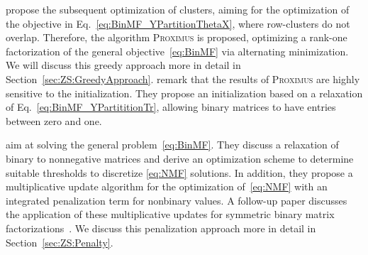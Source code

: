 \cite{koyuturk2003proximus} propose the subsequent optimization of clusters, aiming for the optimization of the objective in Eq.~\eqref{eq:BinMF_YPartitionThetaX}, where row-clusters do not overlap. Therefore, the algorithm \textsc{Proximus} is proposed, optimizing a rank-one factorization of the general objective~\eqref{eq:BinMF} via alternating minimization. We will discuss this greedy approach more in detail in Section~\ref{sec:ZS:GreedyApproach}.
\cite{shen2009mining} remark that the results of \textsc{Proximus} are highly sensitive to the initialization. They propose an initialization based on a relaxation of Eq.~\eqref{eq:BinMF_YPartititionTr}, allowing binary matrices to have entries between zero and one.

\cite{zhang2007binary,zhang2010binary} aim at solving the general problem~\eqref{eq:BinMF}. They discuss a relaxation of binary to nonnegative matrices and derive an optimization scheme to determine suitable thresholds to discretize \ref{eq:NMF} solutions. In addition, they propose a multiplicative update algorithm for the optimization of~\eqref{eq:NMF} with an integrated penalization term for nonbinary values. A follow-up paper discusses the application of these multiplicative updates for symmetric binary matrix factorizations~\citep{zhang2013overlapping}. We discuss this penalization approach more in detail in Section~\ref{sec:ZS:Penalty}.
